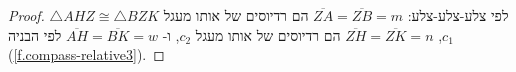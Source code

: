 \begin{proof}

$\triangle AHZ\cong\triangle BZK$
לפי צלע-צלע-צלע: 
$\overline{ZA}=\overline{ZB}=m$
הם רדיוסים של אותו מעגל
$c_1$,
$\overline{ZH}=\overline{ZK}=n$
הם רדיוסים של אותו מעגל
$c_2$,
ו-%
$\overline{AH}=\overline{BK}=w$
לפי הבניה
(\ref{f.compass-relative3}).


\end{proof}
